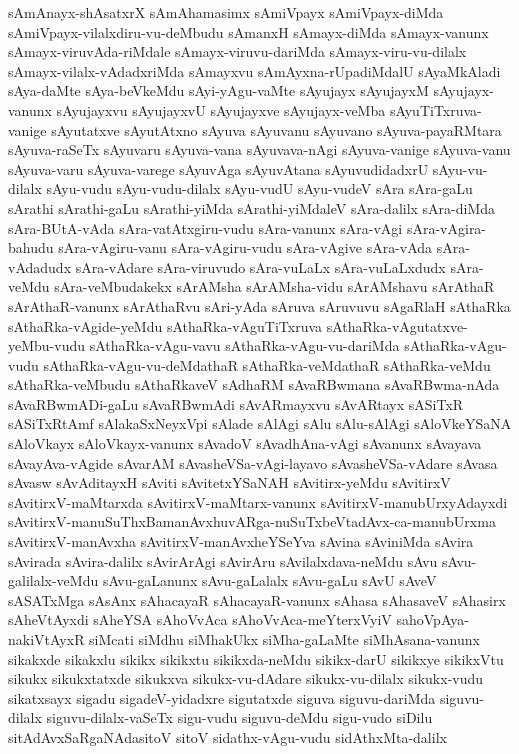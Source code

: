 {sAmAnayx-shAsatxrX
sAmAhamasimx
sAmiVpayx
sAmiVpayx-diMda
sAmiVpayx-vilalxdiru-vu-deMbudu
sAmanxH
sAmayx-diMda
sAmayx-vanunx
sAmayx-viruvAda-riMdale
sAmayx-viruvu-dariMda
sAmayx-viru-vu-dilalx
sAmayx-vilalx-vAdadxriMda
sAmayxvu
sAmAyxna-rUpadiMdalU
sAyaMkAladi
sAya-daMte
sAya-beVkeMdu
sAyi-yAgu-vaMte
sAyujayx
sAyujayxM
sAyujayx-vanunx
sAyujayxvu
sAyujayxvU
sAyujayxve
sAyujayx-veMba
sAyuTiTxruva-vanige
sAyutatxve
sAyutAtxno
sAyuva
sAyuvanu
sAyuvano
sAyuva-payaRMtara
sAyuva-raSeTx
sAyuvaru
sAyuva-vana
sAyuvava-nAgi
sAyuva-vanige
sAyuva-vanu
sAyuva-varu
sAyuva-varege
sAyuvAga
sAyuvAtana
sAyuvudidadxrU
sAyu-vu-dilalx
sAyu-vudu
sAyu-vudu-dilalx
sAyu-vudU
sAyu-vudeV
sAra
sAra-gaLu
sArathi
sArathi-gaLu
sArathi-yiMda
sArathi-yiMdaleV
sAra-dalilx
sAra-diMda
sAra-BUtA-vAda
sAra-vatAtxgiru-vudu
sAra-vanunx
sAra-vAgi
sAra-vAgira-bahudu
sAra-vAgiru-vanu
sAra-vAgiru-vudu
sAra-vAgive
sAra-vAda
sAra-vAdadudx
sAra-vAdare
sAra-viruvudo
sAra-vuLaLx
sAra-vuLaLxdudx
sAra-veMdu
sAra-veMbudakekx
sArAMsha
sArAMsha-vidu
sArAMshavu
sArAthaR
sArAthaR-vanunx
sArAthaRvu
sAri-yAda
sAruva
sAruvuvu
sAgaRlaH
sAthaRka
sAthaRka-vAgide-yeMdu
sAthaRka-vAguTiTxruva
sAthaRka-vAgutatxve-yeMbu-vudu
sAthaRka-vAgu-vavu
sAthaRka-vAgu-vu-dariMda
sAthaRka-vAgu-vudu
sAthaRka-vAgu-vu-deMdathaR
sAthaRka-veMdathaR
sAthaRka-veMdu
sAthaRka-veMbudu
sAthaRkaveV
sAdhaRM
sAvaRBwmana
sAvaRBwma-nAda
sAvaRBwmADi-gaLu
sAvaRBwmAdi
sAvARmayxvu
sAvARtayx
sASiTxR
sASiTxRtAmf
sAlakaSxNeyxVpi
sAlade
sAlAgi
sAlu
sAlu-sAlAgi
sAloVkeYSaNA
sAloVkayx
sAloVkayx-vanunx
sAvadoV
sAvadhAna-vAgi
sAvanunx
sAvayava
sAvayAva-vAgide
sAvarAM
sAvasheVSa-vAgi-layavo
sAvasheVSa-vAdare
sAvasa
sAvasw
sAvAditayxH
sAviti
sAvitetxYSaNAH
sAvitirx-yeMdu
sAvitirxV
sAvitirxV-maMtarxda
sAvitirxV-maMtarx-vanunx
sAvitirxV-manubUrxyAdayxdi
sAvitirxV-manuSuThxBamanAvxhuvARga-nuSuTxbeVtadAvx-ca-manubUrxma
sAvitirxV-manAvxha
sAvitirxV-manAvxheYSeYva
sAvina
sAviniMda
sAvira
sAvirada
sAvira-dalilx
sAvirArAgi
sAvirAru
sAvilalxdava-neMdu
sAvu
sAvu-galilalx-veMdu
sAvu-gaLanunx
sAvu-gaLalalx
sAvu-gaLu
sAvU
sAveV
sASATxMga
sAsAnx
sAhacayaR
sAhacayaR-vanunx
sAhasa
sAhasaveV
sAhasirx
sAheVtAyxdi
sAheYSA
sAhoVvAca
sAhoVvAca-meYterxVyiV
sahoVpAya-nakiVtAyxR
siMcati
siMdhu
siMhakUkx
siMha-gaLaMte
siMhAsana-vanunx
sikakxde
sikakxlu
sikikx
sikikxtu
sikikxda-neMdu
sikikx-darU
sikikxye
sikikxVtu
sikukx
sikukxtatxde
sikukxva
sikukx-vu-dAdare
sikukx-vu-dilalx
sikukx-vudu
sikatxsayx
sigadu
sigadeV-yidadxre
sigutatxde
siguva
siguvu-dariMda
siguvu-dilalx
siguvu-dilalx-vaSeTx
sigu-vudu
siguvu-deMdu
sigu-vudo
siDilu
sitAdAvxSaRgaNAdasitoV
sitoV
sidathx-vAgu-vudu
sidAthxMta-dalilx
}
